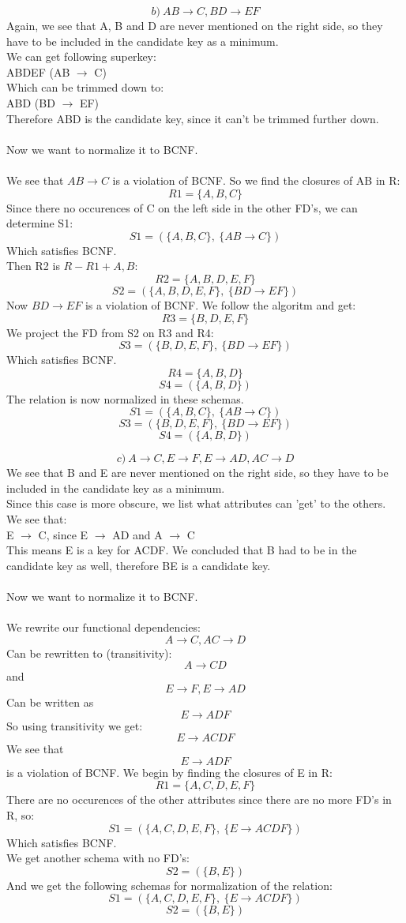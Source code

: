 \documentclass[12pt]{article}
\begin{document}
$$b)\: AB\rightarrow C, BD\rightarrow EF$$
Again, we see that A, B and D are never mentioned on the right side, so they have to be included in the candidate key as a minimum.\\
We can get following superkey:\\
ABDEF (AB $\rightarrow$ C)\\
Which can be trimmed down to:\\
ABD (BD $\rightarrow$ EF)\\
Therefore ABD is the candidate key, since it can't be trimmed further down.\\
\\
Now we want to normalize it to BCNF.\\
\\
We see that $AB\rightarrow C$ is a violation of BCNF. So we find the closures of AB in R:
$$R1=\{A,B,C\}$$
Since there no occurences of C on the left side in the other FD's, we can determine S1:\\
$$S1=(\{A,B,C\},\:\{AB\rightarrow C\})$$
Which satisfies BCNF.\\
Then R2 is $R-R1+{A,B}$:
$$R2=\{A,B,D,E,F\}$$
$$S2=(\{A,B,D,E,F\},\:\{BD\rightarrow EF\})$$
Now $BD\rightarrow EF$ is a violation of BCNF. We follow the algoritm and get:
$$R3=\{B,D,E,F\}$$
We project the FD from S2 on R3 and R4:
$$S3=(\{B,D,E,F\},\:\{BD\rightarrow EF\})$$
Which satisfies BCNF.
$$R4=\{A,B,D\}$$
$$S4=(\{A,B,D\})$$
The relation is now normalized in these schemas.
$$S1=(\{A,B,C\},\:\{AB\rightarrow C\})$$
$$S3=(\{B,D,E,F\},\:\{BD\rightarrow EF\})$$
$$S4=(\{A,B,D\})$$

$$c)\: A\rightarrow C, E\rightarrow F, E\rightarrow AD, AC\rightarrow D$$
We see that B and E are never mentioned on the right side, so they have to be included in the candidate key as a minimum.\\
Since this case is more obscure, we list what attributes can 'get' to the others. We see that:\\
E $\rightarrow$ C, since E $\rightarrow$ AD and A $\rightarrow$ C\\
This means E is a key for ACDF. We concluded that B had to be in the candidate key as well, therefore BE is a candidate key.\\
\\
Now we want to normalize it to BCNF.\\
\\
We rewrite our functional dependencies:
$$A\rightarrow C, AC\rightarrow D$$
Can be rewritten to (transitivity):
$$A\rightarrow CD$$
and
$$E\rightarrow F, E\rightarrow AD$$
Can be written as
$$E\rightarrow ADF$$
So using transitivity we get:
$$E\rightarrow ACDF$$
We see that $$E\rightarrow ADF$$ is a violation of BCNF. We begin by finding the closures of E in R:
$$R1=\{A,C,D,E,F\}$$
There are no occurences of the other attributes since there are no more FD's in R, so:
$$S1=(\{A,C,D,E,F\},\:\{E\rightarrow ACDF\})$$
Which satisfies BCNF.\\
We get another schema with no FD's:
$$S2=(\{B,E\})$$
And we get the following schemas for normalization of the relation:
$$S1=(\{A,C,D,E,F\},\:\{E\rightarrow ACDF\})$$
$$S2=(\{B,E\})$$
\end{document}

